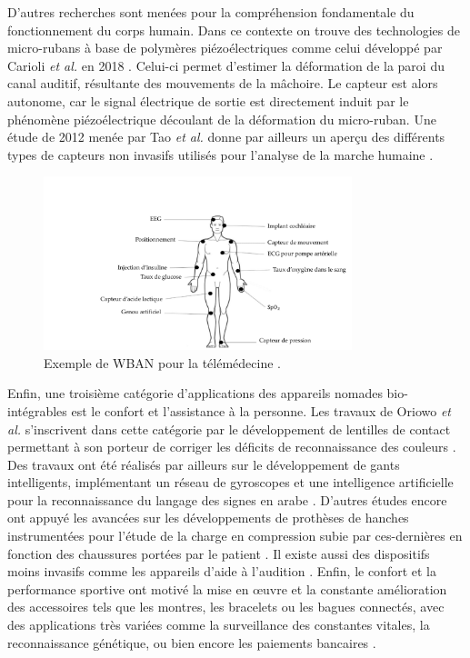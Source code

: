 D'autres recherches sont menées pour la compréhension fondamentale du fonctionnement du corps humain. Dans ce contexte on trouve des technologies de micro-rubans à base de polymères piézoélectriques comme celui développé par Carioli \emph{et al.} en 2018 \cite{Carioli2018}. Celui-ci permet d'estimer la déformation de la paroi du canal auditif, résultante des mouvements de la mâchoire. Le capteur est alors autonome, car le signal électrique de sortie est directement induit par le phénomène piézoélectrique découlant de la déformation du micro-ruban. Une étude de 2012 menée par Tao \emph{et al.} donne par ailleurs un aperçu des différents types de capteurs non invasifs utilisés pour l'analyse de la marche humaine \cite{Tao2012}.
\begin{figure}[!htbp]
	\centering
	\captionsetup{justification=centering}
	\includegraphics[trim={6cm 0cm 0cm 4cm},clip, width=0.8\textwidth]{../Chap1/Figure/capteurs_corps_humain.pdf}
	\caption{Exemple de WBAN pour la télémédecine \cite{Abidi2020}.}
	\label{fig:capteurs_corps_humain}
\end{figure}

Enfin, une troisième catégorie d'applications des appareils nomades bio-intégrables est le confort et l'assistance à la personne. Les travaux de Oriowo \emph{et al.} s'inscrivent dans cette catégorie par le développement de lentilles de contact permettant à son porteur de corriger les déficits de reconnaissance des couleurs \cite{Oriowo2011}. Des travaux ont été réalisés par ailleurs sur le développement de gants intelligents, implémentant un réseau de gyroscopes et une intelligence artificielle pour la reconnaissance du langage des signes en arabe \cite{Qaroush2021}. D'autres études encore ont appuyé les avancées sur les développements de prothèses de hanches instrumentées pour l'étude de la charge en compression subie par ces-dernières en fonction des chaussures portées par le patient \cite{Palmowski2021}. Il existe aussi des dispositifs moins invasifs comme les appareils d'aide à l'audition \cite{Qiao2011}. Enfin, le confort et la performance sportive ont motivé la mise en \oe{}uvre et la constante amélioration des accessoires tels que les montres, les bracelets ou les bagues connectés, avec des applications très variées comme la surveillance des constantes vitales, la reconnaissance génétique, ou bien encore les paiements bancaires \cite{Cornelius2014,Kurz2021,VISA2022,FITBIT2022}.

